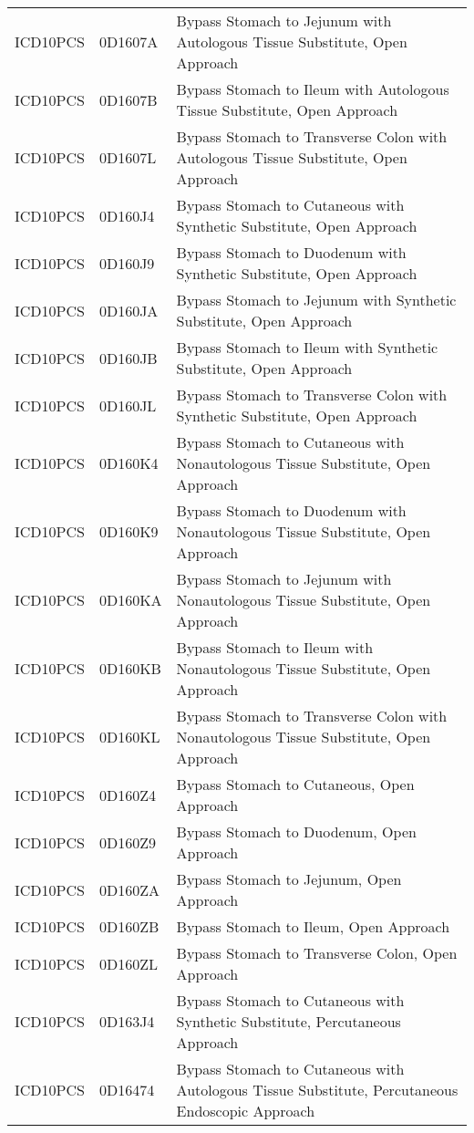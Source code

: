 \begin{longtable}{p{}p{}p{}}
  ICD10PCS & 0D1607A & Bypass Stomach to Jejunum with Autologous Tissue Substitute, Open Approach \\ 
  ICD10PCS & 0D1607B & Bypass Stomach to Ileum with Autologous Tissue Substitute, Open Approach \\ 
  ICD10PCS & 0D1607L & Bypass Stomach to Transverse Colon with Autologous Tissue Substitute, Open Approach \\ 
  ICD10PCS & 0D160J4 & Bypass Stomach to Cutaneous with Synthetic Substitute, Open Approach \\ 
  ICD10PCS & 0D160J9 & Bypass Stomach to Duodenum with Synthetic Substitute, Open Approach \\ 
  ICD10PCS & 0D160JA & Bypass Stomach to Jejunum with Synthetic Substitute, Open Approach \\ 
  ICD10PCS & 0D160JB & Bypass Stomach to Ileum with Synthetic Substitute, Open Approach \\ 
  ICD10PCS & 0D160JL & Bypass Stomach to Transverse Colon with Synthetic Substitute, Open Approach \\ 
  ICD10PCS & 0D160K4 & Bypass Stomach to Cutaneous with Nonautologous Tissue Substitute, Open Approach \\ 
  ICD10PCS & 0D160K9 & Bypass Stomach to Duodenum with Nonautologous Tissue Substitute, Open Approach \\ 
  ICD10PCS & 0D160KA & Bypass Stomach to Jejunum with Nonautologous Tissue Substitute, Open Approach \\ 
  ICD10PCS & 0D160KB & Bypass Stomach to Ileum with Nonautologous Tissue Substitute, Open Approach \\ 
  ICD10PCS & 0D160KL & Bypass Stomach to Transverse Colon with Nonautologous Tissue Substitute, Open Approach \\ 
  ICD10PCS & 0D160Z4 & Bypass Stomach to Cutaneous, Open Approach \\ 
  ICD10PCS & 0D160Z9 & Bypass Stomach to Duodenum, Open Approach \\ 
  ICD10PCS & 0D160ZA & Bypass Stomach to Jejunum, Open Approach \\ 
  ICD10PCS & 0D160ZB & Bypass Stomach to Ileum, Open Approach \\ 
  ICD10PCS & 0D160ZL & Bypass Stomach to Transverse Colon, Open Approach \\ 
  ICD10PCS & 0D163J4 & Bypass Stomach to Cutaneous with Synthetic Substitute, Percutaneous Approach \\ 
  ICD10PCS & 0D16474 & Bypass Stomach to Cutaneous with Autologous Tissue Substitute, Percutaneous Endoscopic Approach \\ 

\end{longtable}
